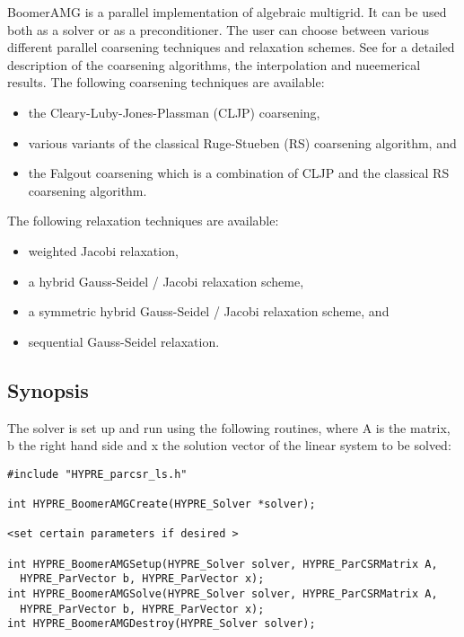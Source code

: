 BoomerAMG is a parallel implementation of algebraic multigrid.  It can be used
both as a solver or as a preconditioner.  The user can choose between various
different parallel coarsening techniques and relaxation schemes.  See
\cite{VEHenson_UMYang_2002} for a detailed description of the coarsening
algorithms, the interpolation and nueemerical results.  The following
coarsening techniques are available:
\begin{itemize}
\item the Cleary-Luby-Jones-Plassman (CLJP) coarsening,
\item various variants of the classical Ruge-Stueben (RS) coarsening algorithm, and
\item the Falgout coarsening which is a combination of CLJP and the
classical RS coarsening algorithm.
\end{itemize}
The following relaxation techniques are available:
\begin{itemize}
\item weighted Jacobi relaxation,
\item a hybrid Gauss-Seidel / Jacobi relaxation scheme, 
\item a symmetric hybrid Gauss-Seidel / Jacobi relaxation scheme, and
\item sequential Gauss-Seidel relaxation.
\end{itemize}


\subsection{Synopsis}

The solver is set up and run using the following routines,
where A is the matrix, b the right hand side and x the solution vector
of the linear system to be solved:

\begin{display}
\begin{verbatim}
#include "HYPRE_parcsr_ls.h"

int HYPRE_BoomerAMGCreate(HYPRE_Solver *solver); 

<set certain parameters if desired >

int HYPRE_BoomerAMGSetup(HYPRE_Solver solver, HYPRE_ParCSRMatrix A,
  HYPRE_ParVector b, HYPRE_ParVector x);
int HYPRE_BoomerAMGSolve(HYPRE_Solver solver, HYPRE_ParCSRMatrix A,
  HYPRE_ParVector b, HYPRE_ParVector x);
int HYPRE_BoomerAMGDestroy(HYPRE_Solver solver);
\end{verbatim}
\end{display}

